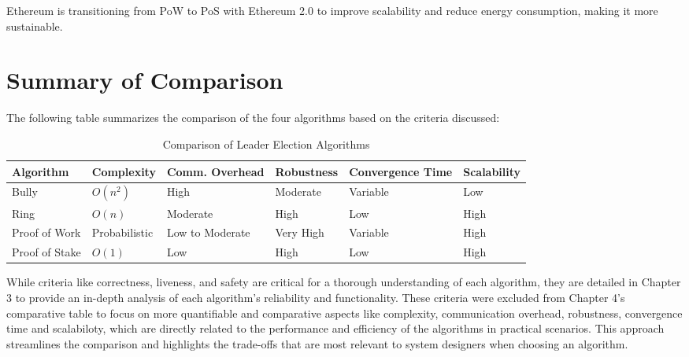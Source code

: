 Ethereum is transitioning from PoW to PoS with Ethereum 2.0 to improve scalability and reduce energy consumption, making it more sustainable.

\section{Summary of Comparison}

The following table summarizes the comparison of the four algorithms based on the criteria discussed:

\begin{table}[h!]
\centering
\begin{tabular}{|>{\centering\arraybackslash}m{2.5cm}|>{\centering\arraybackslash}m{2cm}|>{\centering\arraybackslash}m{2.4cm}|>{\centering\arraybackslash}m{2.4cm}|>{\centering\arraybackslash}m{2.7cm}|>{\centering\arraybackslash}m{2.2cm}|}
\hline
\textbf{Algorithm} & \textbf{Complexity} & \textbf{Comm. Overhead} & \textbf{Robustness} & \textbf{Convergence Time} & \textbf{Scalability}\\
\hline
Bully & \(O(n^2)\) & High & Moderate & Variable & Low\\
\hline
Ring & \(O(n)\) & Moderate & High & Low & High\\
\hline
Proof of Work & Probabilistic & Low to Moderate & Very High & Variable & High \\
\hline
Proof of Stake & \(O(1)\) & Low & High & Low & High \\
\hline
\end{tabular}
\caption{Comparison of Leader Election Algorithms}
\label{table:comparison}
\end{table}
While criteria like correctness, liveness, and safety are critical for a thorough understanding of each algorithm, they are detailed in Chapter 3 to provide an in-depth analysis of each algorithm’s reliability and functionality. These criteria were excluded from Chapter 4’s comparative table to focus on more quantifiable and comparative aspects like complexity, communication overhead, robustness, convergence time and scalabiloty, which are directly related to the performance and efficiency of the algorithms in practical scenarios. This approach streamlines the comparison and highlights the trade-offs that are most relevant to system designers when choosing an algorithm.


